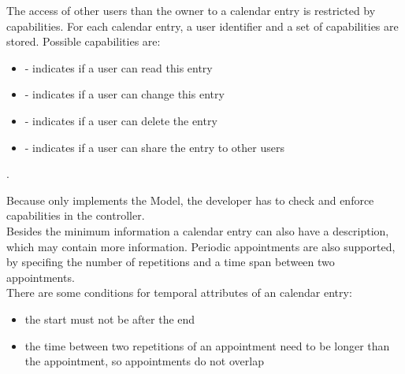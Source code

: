 The access of other users than the owner to a calendar entry is restricted by capabilities.
For each calendar entry, a user identifier and a set of capabilities are stored.
Possible capabilities are:
\begin{itemize}
    \item {} - indicates if a user can read this entry
    \item {} - indicates if a user can change this entry
    \item {} - indicates if a user can delete the entry
    \item {} - indicates if a user can share the entry to other users
\end{itemize}.

Because \salespoint{} only implements the Model, the developer has to check and enforce capabilities in the controller.
\\

Besides the minimum information a calendar entry can also have a description, which may contain more information.
Periodic appointments are also supported, by specifing the number of repetitions and a time span between two appointments.
\\

There are some conditions for temporal attributes of an calendar entry:
\begin{itemize}
    \item the start must not be after the end
    \item the time between two repetitions of an appointment need to be longer than the appointment, so appointments do not overlap
\end{itemize}
